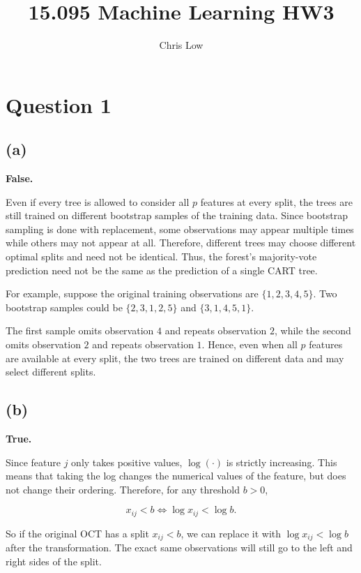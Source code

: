 \documentclass{article}
\title{15.095 Machine Learning HW3}
\author{Chris Low}
\date{} %
\begin{document}
\maketitle

\section*{Question 1}

\subsection*{(a)}

\textbf{False.}

Even if every tree is allowed to consider all $p$ features at every split, the trees are still trained on different bootstrap samples of the training data. Since bootstrap sampling is done with replacement, some observations may appear multiple times while others may not appear at all. Therefore, different trees may choose different optimal splits and need not be identical. Thus, the forest's majority-vote prediction need not be the same as the prediction of a single CART tree.

For example, suppose the original training observations are $
\{1,2,3,4,5\}.
$ Two bootstrap samples could be
$
\{2,3,1,2,5\}$ and 
$
\{3,1,4,5,1\}.
$

The first sample omits observation $4$ and repeats observation $2$, while the second omits observation $2$ and repeats observation $1$. Hence, even when all $p$ features are available at every split, the two trees are trained on different data and may select different splits.

\vspace{5mm}

\subsection*{(b)}

\textbf{True. 
}

Since feature $j$ only takes positive values, $\log(\cdot)$ is strictly increasing. This means that taking the log changes the numerical values of the feature, but does not change their ordering. Therefore, for any threshold $b>0$,

$$
x_{ij} < b
\iff
\log x_{ij} < \log b.
$$

So if the original OCT has a split $x_{ij}<b$, we can replace it with $\log x_{ij}<\log b$ after the transformation. The exact same observations will still go to the left and right sides of the split.
\end{document}
